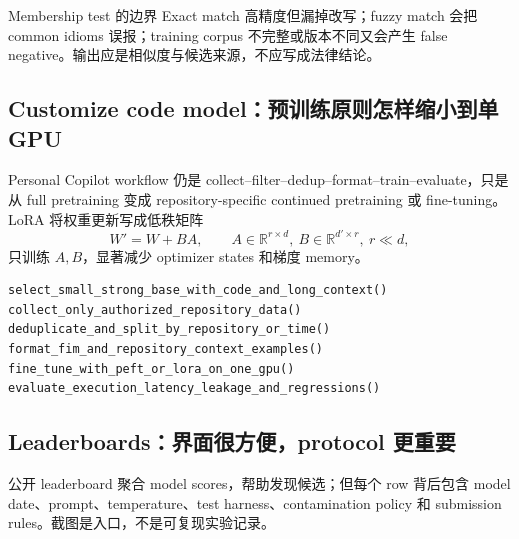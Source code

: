 
\begin{knowledgebox}{Membership test 的边界}
Exact match 高精度但漏掉改写；fuzzy match 会把 common idioms 误报；training corpus 不完整或版本不同又会产生 false negative。输出应是相似度与候选来源，不应写成法律结论。
\end{knowledgebox}


\subsection{Customize code model：预训练原则怎样缩小到单 GPU}

Personal Copilot workflow 仍是 collect--filter--dedup--format--train--evaluate，只是从 full pretraining 变成 repository-specific continued pretraining 或 fine-tuning。LoRA 将权重更新写成低秩矩阵
\[
W'=W+BA,\qquad A\in\mathbb{R}^{r\times d},\ B\in\mathbb{R}^{d'\times r},\ r\ll d,
\]
只训练 $A,B$，显著减少 optimizer states 和梯度 memory。


\begin{lstlisting}[caption={小预算 code assistant 的可执行路径}]
select_small_strong_base_with_code_and_long_context()
collect_only_authorized_repository_data()
deduplicate_and_split_by_repository_or_time()
format_fim_and_repository_context_examples()
fine_tune_with_peft_or_lora_on_one_gpu()
evaluate_execution_latency_leakage_and_regressions()
\end{lstlisting}


\subsection{Leaderboards：界面很方便，protocol 更重要}

公开 leaderboard 聚合 model scores，帮助发现候选；但每个 row 背后包含 model date、prompt、temperature、test harness、contamination policy 和 submission rules。截图是入口，不是可复现实验记录。

